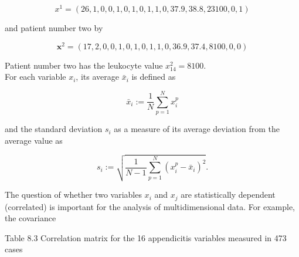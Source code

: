 \documentclass[10pt]{book}
\begin{document}
\begin{center}
\begin{enumerate}
\begin{center}
$$
x^{1}=(26,1,0,0,1,0,1,0,1,1,0,37.9,38.8,23100,0,1)
$$

and patient number two by

$$
\boldsymbol{x}^{2}=(17,2,0,0,1,0,1,0,1,1,0,36.9,37.4,8100,0,0)
$$

Patient number two has the leukocyte value $x_{14}^{2}=8100$.\\
For each variable $x_{i}$, its average $\bar{x}_{i}$ is defined as

$$
\bar{x}_{i}:=\frac{1}{N} \sum_{p=1}^{N} x_{i}^{p}
$$

and the standard deviation $s_{i}$ as a measure of its average deviation from the average value as

$$
s_{i}:=\sqrt{\frac{1}{N-1} \sum_{p=1}^{N}\left(x_{i}^{p}-\bar{x}_{i}\right)^{2}} .
$$

The question of whether two variables $x_{i}$ and $x_{j}$ are statistically dependent (correlated) is important for the analysis of multidimensional data. For example, the covariance

Table 8.3 Correlation matrix for the 16 appendicitis variables measured in 473 cases


\end{center}
\end{enumerate}
\end{center}
\end{document}
